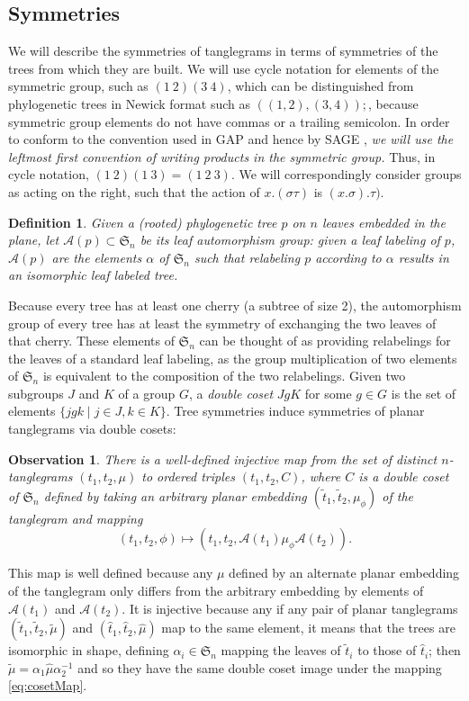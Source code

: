 \documentclass{amsart}
\newtheorem{definition}{Definition}
\newtheorem{observation}{Observation}
\newcommand{\fS}{\mathfrak S}
\newcommand{\aut}{\mathcal A}
\newcommand{\pairing}{\mu}
\begin{document}
\subsection{Symmetries}
We will describe the symmetries of tanglegrams in terms of symmetries of the trees from which they are built.
We will use cycle notation for elements of the symmetric group, such as $(1\ 2) (3\ 4)$, which can be distinguished from phylogenetic trees in Newick format \cite{wiki:newick} such as $((1,2),(3,4));$, because symmetric group elements do not have commas or a trailing semicolon.
In order to conform to the convention used in GAP \cite{GAP4} and hence by SAGE \cite{SteinJoyner2005}, \emph{we will use the leftmost first convention of writing products in the symmetric group.}
Thus, in cycle notation, $(1\ 2) (1\ 3) = (1\ 2\ 3)$.
We will correspondingly consider groups as acting on the right, such that the action of $x.(\sigma \tau)$ is $(x.\sigma) . \tau)$.

\begin{definition}
Given a (rooted) phylogenetic tree $p$ on $n$ leaves embedded in the plane, let $\aut(p) \subset \fS_n$ be its leaf automorphism group: given a leaf labeling of $p$, $\aut(p)$ are the elements $\alpha$ of $\fS_n$ such that relabeling $p$ according to $\alpha$ results in an isomorphic leaf labeled tree.
\end{definition}
Because every tree has at least one cherry (a subtree of size 2), the automorphism group of every tree has at least the symmetry of exchanging the two leaves of that cherry.
These elements of $\fS_n$ can be thought of as providing relabelings for the leaves of a standard leaf labeling, as the group multiplication of two elements of $\fS_n$ is equivalent to the composition of the two relabelings.
Given two subgroups $J$ and $K$ of a group $G$, a \emph{double coset} $JgK$ for some $g \in G$ is the set of elements $\{jgk \mid j \in J, k \in K\}$.
Tree symmetries induce symmetries of planar tanglegrams via double cosets:
\begin{observation}
\label{obs:cosetMap}
There is a well-defined injective map from the set of distinct $n$-tanglegrams $(t_1, t_2, \pairing)$ to ordered triples $(t_1, t_2, C)$, where $C$ is a double coset of $\fS_n$ defined by taking an arbitrary planar embedding $(\tilde t_1, \tilde t_2, \pairing_\phi)$ of the tanglegram and mapping
\begin{equation}
\label{eq:cosetMap}
(t_1, t_2, \phi) \mapsto (t_1, t_2, \aut(t_1) \pairing_\phi \aut(t_2)).
\end{equation}
\end{observation}
This map is well defined because any $\pairing$ defined by an alternate planar embedding of the tanglegram only differs from the arbitrary embedding by elements of $\aut(t_1)$ and $\aut(t_2)$.
It is injective because any if any pair of planar tanglegrams $(\tilde t_1, \tilde t_2, \tilde \pairing)$ and $(\hat t_1, \hat t_2, \hat \pairing)$ map to the same element, it means that the trees are isomorphic in shape, defining $\alpha_i \in \fS_n$ mapping the leaves of $\tilde t_i$ to those of $\hat t_i$; then $\tilde \pairing = \alpha_1 \hat \pairing \alpha_2^{-1}$ and so they have the same double coset image under the mapping \eqref{eq:cosetMap}.
\end{document}
